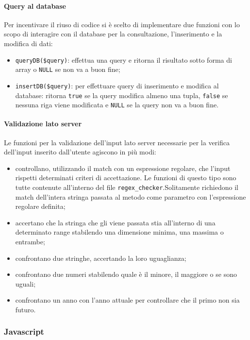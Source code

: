 \documentclass[12pt,a4paper,headings=optiontohead]{article}
\begin{document}
\paragraph{Query al database}
Per incentivare il riuso di codice si è scelto di implementare due funzioni con lo scopo di interagire con il database per la consultazione, l'inserimento e la modifica di dati:
\begin{itemize}
	\item \texttt{queryDB(\$query)}: effettua una query e ritorna il risultato sotto forma di array o \texttt{NULL} se non va a buon fine;
	\item \texttt{insertDB(\$query)}: per effettuare query di inserimento e modifica al database: ritorna \texttt{true} se la query modifica almeno una tupla, \texttt{false} se nessuna riga viene modificata e \texttt{NULL} se la query non va a buon fine.
\end{itemize}
\paragraph{Validazione lato server}
Le funzioni per la validazione dell'input lato server necessarie per la verifica dell'input inserito dall'utente agiscono in più modi:
\begin{itemize}
	\item controllano, utilizzando il match con un espressione regolare, che l'input rispetti determinati criteri di accettazione. Le funzioni di questo tipo sono tutte contenute all'interno del file \texttt{regex\_checker}.Solitamente richiedono il match dell'intera stringa passata al metodo come parametro con l'espressione regolare definita;
	\item accertano che la stringa che gli viene passata stia all'interno di una determinato range stabilendo una dimensione minima, una massima o entrambe;
	\item confrontano due stringhe, accertando la loro uguaglianza;
	\item confrontano due numeri stabilendo quale è il minore, il maggiore o se sono uguali;
	\item confrontano un anno con l'anno attuale per controllare che il primo non sia futuro.
\end{itemize}


\subsubsection{Javascript}
\end{document}
